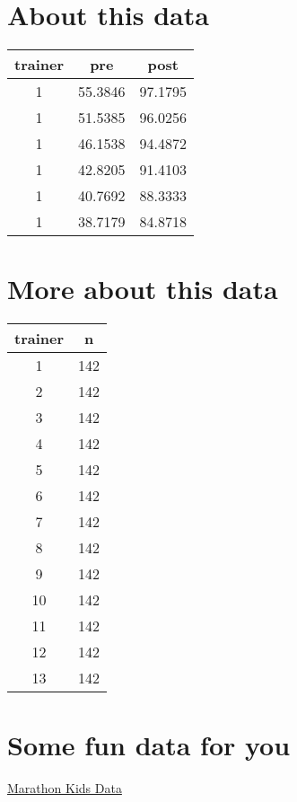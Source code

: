 \documentclass[
]{book}
\begin{document}
\hypertarget{about-this-data}{%
\section{About this data}\label{about-this-data}}

\begin{tabular}{c|c|c}
\hline
trainer & pre & post\\
\hline
1 & 55.3846 & 97.1795\\
\hline
1 & 51.5385 & 96.0256\\
\hline
1 & 46.1538 & 94.4872\\
\hline
1 & 42.8205 & 91.4103\\
\hline
1 & 40.7692 & 88.3333\\
\hline
1 & 38.7179 & 84.8718\\
\hline
\end{tabular}

\hypertarget{more-about-this-data}{%
\section{More about this data}\label{more-about-this-data}}

\begin{tabular}{c|c}
\hline
trainer & n\\
\hline
1 & 142\\
\hline
2 & 142\\
\hline
3 & 142\\
\hline
4 & 142\\
\hline
5 & 142\\
\hline
6 & 142\\
\hline
7 & 142\\
\hline
8 & 142\\
\hline
9 & 142\\
\hline
10 & 142\\
\hline
11 & 142\\
\hline
12 & 142\\
\hline
13 & 142\\
\hline
\end{tabular}

\hypertarget{some-fun-data-for-you}{%
\section{Some fun data for you}\label{some-fun-data-for-you}}

\href{https://github.com/docs4class/marathon_kids_data/upload/main}{Marathon Kids Data}
\end{document}
